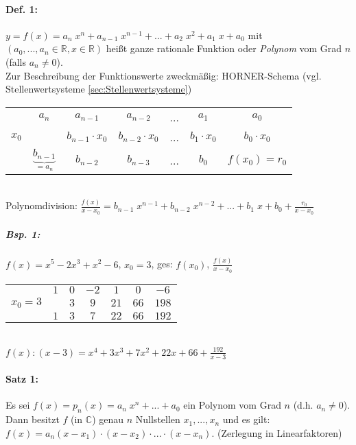 \paragraph{Def. 1:} \parskp
$y=f(x)=a_n\; x^n+a_{n-1}\;x^{n-1}+...+a_2\; x^2+a_1\; x+a_0$ mit $(a_0, ..., a_n \in \mathbb{R}, x\in \mathbb{R})$ heißt ganze rationale Funktion oder \emph{Polynom} vom Grad $n$ (falls $a_n \not = 0$).\\
Zur Beschreibung der Funktionswerte zweckmäßig: HORNER-Schema (vgl. Stellenwertsysteme \ref{sec:Stellenwertsysteme})\\
\begin{tabular}{r | c c c c c c}
 & $a_n$ & $a_{n-1}$ & $ a_{n-2}$ & ... & $a_1$ & $a_0$\\
$x_0$ &  & $b_{n-1}\cdot x_0$ & $b_{n-2}\cdot x_0$ & ... & $b_1 \cdot x_0$ & $b_0\cdot x_0$ \\
\hline
 & $\underbrace{\boxed{b_{n-1}}}_{=a_n}$ & $\boxed{b_{n-2}}$ & $\boxed{b_{n-3}}$ & ... & $\boxed{b_0}$ & $f(x_0)=r_0$\\
\end{tabular}\\
Polynomdivision: $\frac{f(x)}{x-x_0}=b_{n-1}\;x^{n-1}+b_{n-2}\;x^{n-2}+...+b_1\; x + b_0 + \frac{r_0}{x-x_0}$

\subparagraph{Bsp. 1:} \parskp
$f(x)=x^5-2x^3+x^2-6$, \quad $x_0=3$, \quad ges: $f(x_0)$, \quad$\frac{f(x)}{x-x_0}$\\
\begin{tabular}{r| c c c c c c}
 & $1$ & $0$ & $-2$ & $1$ & $0$ & $-6$\\
$x_0=3$ &  & $3$ & $9$ & $21$ & $66$ & $198$ \\
\hline
 & $1$ & $3$ & $7$ & $22$ & $66$ & $192$\\
\end{tabular}\\
$f(x):(x-3)=x^4+3 x^3 + 7x^2+22x + 66 + \frac{192}{x-3}$

\paragraph{Satz 1:} \parskp
Es sei $f(x)=p_n(x) = a_n \; x^n + ... + a_0$ ein Polynom vom Grad $n$ (d.h. $a_n\not = 0$). Dann besitzt $f$ (in $\mathbb{C}$) genau $n$ Nullstellen $x_1,...,x_n$ und es gilt: $f(x) = a_n (x-x_1)\cdot (x-x_2)\cdot ... \cdot (x-x_n)$. (Zerlegung in Linearfaktoren)

